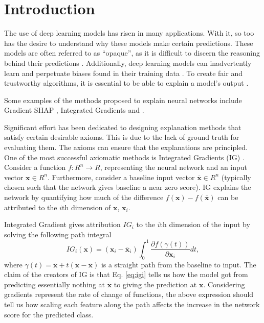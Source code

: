\section{Introduction}
\label{sec:introduction}

The use of deep learning models has risen in many applications. With it, so too has the desire to understand why these models make certain predictions. These models are often referred to as ``opaque'', as it is difficult to discern the reasoning behind their predictions \citep{marcus2018deep}. Additionally, deep learning models can inadvertently learn and perpetuate biases found in their training data \citep{sap2019risk}. To create fair and trustworthy algorithms, it is essential to be able to explain a model's output \citep{das2020opportunities}. 

Some examples of the methods proposed to explain neural networks include Gradient SHAP \cite{lundberg2017unified}, Integrated Gradients  \citep{sundararajan2017axiomatic} and  \citep{kapishnikov2021guided}.

Significant effort has been dedicated to designing explanation methods that satisfy certain desirable axioms. This is due to the lack of ground truth for evaluating them. The axioms can ensure that the explanations are principled. One of the most successful axiomatic methods is Integrated Gradients (IG) \citep{sundararajan2017axiomatic}. Consider a function $f : R^n \to R$, representing the neural network and an input vector $\textbf{x} \in R^n$. Furthermore, consider a baseline input vector $\overline{\textbf{x}} \in R^n$ (typically chosen such that the network gives baseline a near zero score). IG explains the network by quantifying how much of the difference $f(\textbf{x}) - f(\overline{\textbf{x}})$ can be attributed to the $i$th dimension of $\textbf{x}$, $\textbf{x}_i$.

Integrated Gradient gives attribution $IG_i$ to the $i$th dimension of the input by solving the following path integral
\begin{equation}
IG_i(\textbf{x}) = (\textbf{x}_i - \overline{\textbf{x}}_i) \int_0^1 \frac{\partial f(\gamma(t))}{\partial \textbf{x}_i} dt, \label{eq:igi}
\end{equation}
where $\gamma(t) = \overline{\textbf{x}} + t(\textbf{x} - \overline{\textbf{x}})$ is a straight path from the baseline to input. The claim of the creators of IG is that Eq. \ref{eq:igi} tells us how the model got from predicting essentially nothing at $\overline{\textbf{x}}$ to giving the prediction at $\textbf{x}$. Considering gradients represent the rate of change of functions, the above expression should tell us how scaling each feature along the path affects the increase in the network score for the predicted class.

